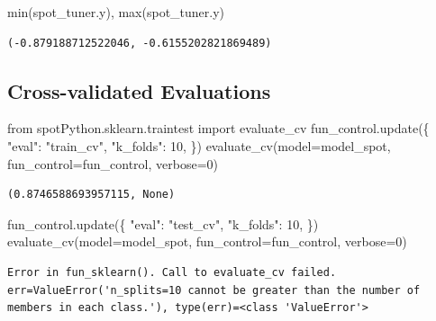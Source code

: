\documentclass[
  letterpaper,
  DIV=11,
  numbers=noendperiod]{scrreprt}
\newenvironment{Shaded}{\begin{snugshade}}{\end{snugshade}}
\newcommand{\BuiltInTok}[1]{\textcolor[rgb]{0.00,0.23,0.31}{#1}}
\newcommand{\DecValTok}[1]{\textcolor[rgb]{0.68,0.00,0.00}{#1}}
\newcommand{\ImportTok}[1]{\textcolor[rgb]{0.00,0.46,0.62}{#1}}
\newcommand{\NormalTok}[1]{\textcolor[rgb]{0.00,0.23,0.31}{#1}}
\newcommand{\OperatorTok}[1]{\textcolor[rgb]{0.37,0.37,0.37}{#1}}
\newcommand{\StringTok}[1]{\textcolor[rgb]{0.13,0.47,0.30}{#1}}
\begin{document}
\begin{Shaded}
\begin{Highlighting}[]
\BuiltInTok{min}\NormalTok{(spot\_tuner.y), }\BuiltInTok{max}\NormalTok{(spot\_tuner.y)}
\end{Highlighting}
\end{Shaded}

\begin{verbatim}
(-0.879188712522046, -0.6155202821869489)
\end{verbatim}

\hypertarget{cross-validated-evaluations}{%
\subsection{Cross-validated
Evaluations}\label{cross-validated-evaluations}}

\begin{Shaded}
\begin{Highlighting}[]
\ImportTok{from}\NormalTok{ spotPython.sklearn.traintest }\ImportTok{import}\NormalTok{ evaluate\_cv}
\NormalTok{fun\_control.update(\{}
     \StringTok{"eval"}\NormalTok{: }\StringTok{"train\_cv"}\NormalTok{,}
     \StringTok{"k\_folds"}\NormalTok{: }\DecValTok{10}\NormalTok{,}
\NormalTok{\})}
\NormalTok{evaluate\_cv(model}\OperatorTok{=}\NormalTok{model\_spot, fun\_control}\OperatorTok{=}\NormalTok{fun\_control, verbose}\OperatorTok{=}\DecValTok{0}\NormalTok{)}
\end{Highlighting}
\end{Shaded}

\begin{verbatim}
(0.8746588693957115, None)
\end{verbatim}

\begin{Shaded}
\begin{Highlighting}[]
\NormalTok{fun\_control.update(\{}
     \StringTok{"eval"}\NormalTok{: }\StringTok{"test\_cv"}\NormalTok{,}
     \StringTok{"k\_folds"}\NormalTok{: }\DecValTok{10}\NormalTok{,}
\NormalTok{\})}
\NormalTok{evaluate\_cv(model}\OperatorTok{=}\NormalTok{model\_spot, fun\_control}\OperatorTok{=}\NormalTok{fun\_control, verbose}\OperatorTok{=}\DecValTok{0}\NormalTok{)}
\end{Highlighting}
\end{Shaded}

\begin{verbatim}
Error in fun_sklearn(). Call to evaluate_cv failed. err=ValueError('n_splits=10 cannot be greater than the number of members in each class.'), type(err)=<class 'ValueError'>
\end{verbatim}
\end{document}

